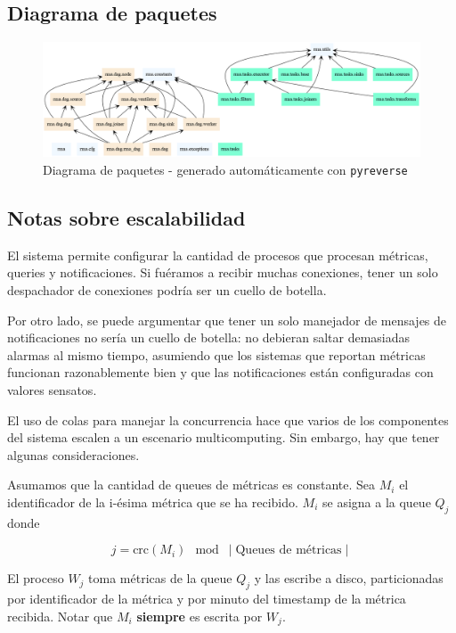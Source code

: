 \documentclass[titlepage,a4paper,oneside]{article}
\begin{document}
\subsection{Diagrama de paquetes}
\begin{figure}[H]
\centering
\includegraphics[width=\textwidth]{images/packages.png}
\caption{Diagrama de paquetes - generado automáticamente con \texttt{pyreverse}}
\end{figure}

\subsection{Notas sobre escalabilidad}
El sistema permite configurar la cantidad de procesos que procesan métricas, queries y notificaciones. Si fuéramos a recibir muchas conexiones, tener un solo despachador de conexiones podría ser un cuello de botella.

Por otro lado, se puede argumentar que tener un solo manejador de mensajes de notificaciones no sería un cuello de botella: no debieran saltar demasiadas alarmas al mismo tiempo, asumiendo que los sistemas que reportan métricas funcionan razonablemente bien y que las notificaciones están configuradas con valores sensatos.

El uso de colas para manejar la concurrencia hace que varios de los componentes del sistema escalen a un escenario multicomputing. Sin embargo, hay que tener algunas consideraciones.

Asumamos que la cantidad de queues de métricas es constante. Sea $M_i$ el identificador de la i-ésima métrica que se ha recibido. $M_i$ se asigna a la queue $Q_j$ donde

\begin{equation}\label{crcindex}
	j = \text{crc}(M_i) \mod \mid \text{Queues de métricas} \mid
\end{equation}

El proceso $W_j$ toma métricas de la queue $Q_j$ y las escribe a disco, particionadas por identificador de la métrica y por minuto del timestamp de la métrica recibida. Notar que $M_i$ \textbf{siempre} es escrita por $W_j$.
\end{document}

